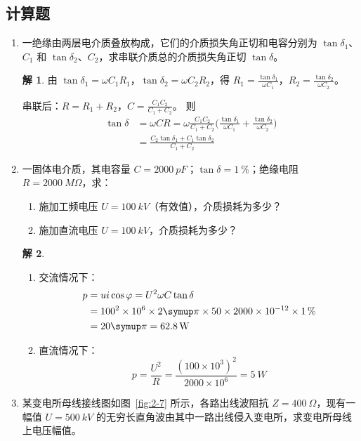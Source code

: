 \documentclass[zihao=-4,fontset = none]{ctexart}
\theoremstyle{definition}
\newtheorem*{solution}{解}
\begin{document}
\subsection{计算题}
\begin{enumerate}
  \item 一绝缘由两层电介质叠放构成，它们的介质损失角正切和电容分别为 $\tan δ_1$、$C_1$ 和 $\tan δ_2$、$C_2$，求串联介质总的介质损失角正切 $\tan δ$。
  \begin{solution}
    由 $\tan\delta_1 = \omega C_1R_1$，$\tan\delta_2 = \omega C_2R_2$，得 $R_1 = \frac{\tan\delta_1}{\omega C_1}$，$R_2 = \frac{\tan\delta_2}{\omega C_2}$。

    串联后：$R=R_1+R_2$，$C = \frac{C_1C_2}{C_1 + C_2}$。
    则
    \begin{align*}
      \tan\delta &= \omega CR = \omega \frac{C_1 C_2}{C_1+C_2} \Biggl( \frac{\tan\delta_1}{\omega C_1} + \frac{\tan\delta_2}{\omega C_2} \Biggr) \\
      &= \frac{ C_2 \tan\delta_1 + C_1 \tan\delta_2 }{C_1+C_2}
    \end{align*}
  \end{solution}
  \item 一固体电介质，其电容量 $C = \SI{2000}{pF}$；$\tan δ =\SI{1}{\percent}$；绝缘电阻 $R=\SI{2000}{MΩ}$，求：
  \begin{enumerate}
    \item 施加工频电压 $U=\SI{100}{kV}$（有效值），介质损耗为多少？
    \item 施加直流电压 $U=\SI{100}{kV}$，介质损耗为多少？
  \end{enumerate}
  \begin{solution}
    \begin{enumerate}
      \item 交流情况下：
      \begin{align*}
        p &= ui\cos\varphi = U^2 \omega C \tan\delta \\
          &= 100^2 \times 10^6 \times 2 \symup \pi \times 50 \times 2000 \times 10^{-12} \times \SI{1}{\percent} \\
          &= 20 \symup \pi = \SI{62.8}{W}
      \end{align*}
      \item 直流情况下：
      \[ p = \frac{U^2}{R} = \frac{(100 \times 10^3)^2}{2000 \times 10^6} = \SI{5}{W} \]
    \end{enumerate}
  \end{solution}
  \item \label{ti:2-7}某变电所母线接线图如图~\ref{fig:2-7} 所示，各路出线波阻抗 $Z=\SI{400}{Ω}$，现有一幅值 $U=\SI{500}{kV}$ 的无穷长直角波由其中一路出线侵入变电所，求变电所母线上电压幅值。

\end{enumerate}
\end{document}
